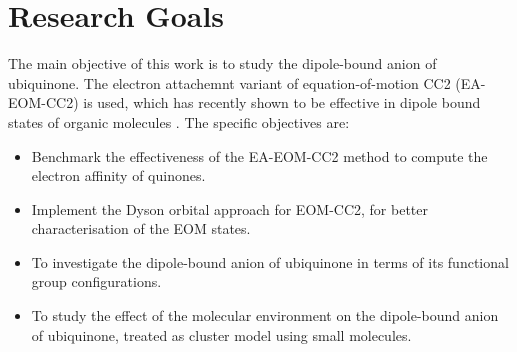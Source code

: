 \section{Research Goals}
The main objective of this work is to study the dipole-bound anion of ubiquinone. The electron attachemnt variant of equation-of-motion CC2 (EA-EOM-CC2) is used, which has recently shown to be effective in dipole bound states of organic molecules \cite{paran2024performance}. The specific objectives are:
\begin{itemize}
  \item Benchmark the effectiveness of the EA-EOM-CC2 method to compute the electron affinity of quinones.
  \item Implement the Dyson orbital approach for EOM-CC2, for better characterisation of the EOM states.
  \item To investigate the dipole-bound anion of ubiquinone in terms of its functional group configurations.
  \item To study the effect of the molecular environment on the dipole-bound anion of ubiquinone, treated as cluster model using small molecules.
\end{itemize}

\cleardoublepage


